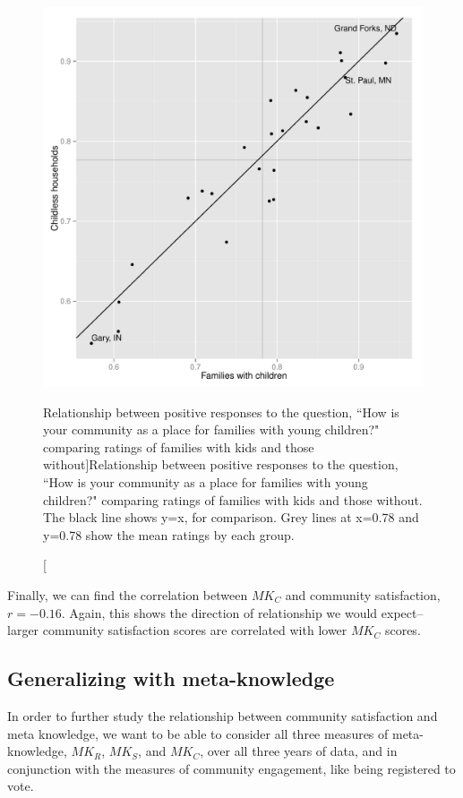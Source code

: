 \documentclass[smallextended]{svjour3}\usepackage[]{graphicx}\usepackage[]{color}
\newenvironment{knitrout}{}{} %
\begin{document}
\begin{knitrout}
\color{fgcolor}\begin{figure}

{\centering \includegraphics[width=0.76\linewidth]{figure/anotherlookkids-1} 

}

\caption[Relationship between positive responses to the question, ``How is your community as a place for families with young children?" comparing ratings of families with kids and those without]{Relationship between positive responses to the question, ``How is your community as a place for families with young children?" comparing ratings of families with kids and those without. The black line shows y=x, for comparison. Grey lines at x=0.78 and y=0.78 show the mean ratings by each group.}\label{fig:anotherlookkids}
\end{figure}


\end{knitrout}

Finally, we can find the correlation between $MK_C$ and community satisfaction, $r= $\ensuremath{-0.16}. Again, this shows the direction of relationship we would expect-- larger community satisfaction scores are correlated with lower $MK_C$ scores. 

\subsection{Generalizing with meta-knowledge}
In order to further study the relationship between community satisfaction and meta knowledge, we want to be able to consider all three measures of meta-knowledge, $MK_R$, $MK_S$, and  $MK_C$, over all three years of data, and in conjunction with the measures of community engagement, like being registered to vote. 
\end{document}
